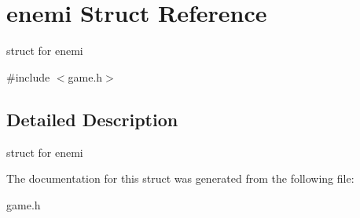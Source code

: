 \hypertarget{structenemi}{}\section{enemi Struct Reference}
\label{structenemi}


struct for enemi  




{\ttfamily \#include $<$game.\+h$>$}



\subsection{Detailed Description}
struct for enemi 

The documentation for this struct was generated from the following file\+:\begin{DoxyCompactItemize}
\item 
game.\+h\end{DoxyCompactItemize}
